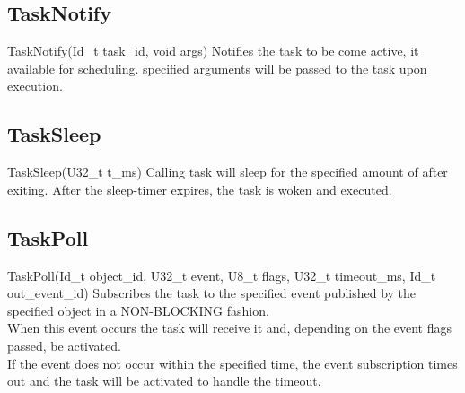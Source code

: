 \subsection{TaskNotify}
\label{func:TaskNotify}
\begin{pdfunction}
{TaskNotify(Id\_t task\_id, void args) }
{ 
Notifies the task to be come active, 
it available for scheduling. 
specified arguments will be passed to the task upon execution. }
\end{pdfunction}

\subsection{TaskSleep}
\label{func:TaskSleep}
\begin{pdfunction}
{TaskSleep(U32\_t t\_ms) }
{ 
Calling task will sleep for the specified amount of 
after exiting. After the sleep-timer expires, the task is 
woken and executed. }
\end{pdfunction}


\subsection{TaskPoll}
\label{func:TaskPoll}
\begin{pdfunction}
{TaskPoll(Id\_t object\_id, U32\_t event, U8\_t flags,  U32\_t timeout\_ms, Id\_t out\_event\_id) }
{ 
Subscribes the task to the specified event published by the
specified object in a NON-BLOCKING fashion.\\
When this event occurs the task will receive it and, depending on the
event flags passed, be activated.\\
If the event does not occur within the specified time, the event subscription
times out and the task will be activated to handle the timeout. }
\end{pdfunction}

